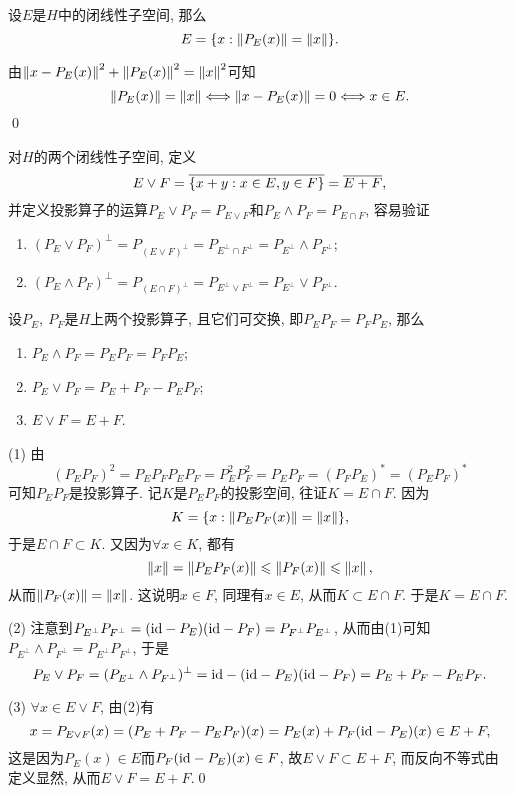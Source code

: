 	\begin{Corollary}
	设$ E $是$ H $中的闭线性子空间, 那么
	\[
	E=\{ x : \norm{P_E(x)}=\norm{x} \}.
	\]
	\end{Corollary}
	\begin{Proof}
	由$ \norm{x-P_E(x)}^2+\norm{P_E(x)}^2=\norm{x}^2 $可知
	\[
	\norm{P_E(x)}=\norm{x}\Longleftrightarrow\norm{x-P_E(x)}=0\Longleftrightarrow x\in E.
	\]
	\qed
	\end{Proof}
	
	对$ H $的两个闭线性子空间, 定义
	\[
	E\lor F=\baro{\{x+y : x\in E, y\in F\}}=\baro{E+F},
	\]
	并定义投影算子的运算$ P_E\lor P_F=P_{E\lor F} $和$ P_E\land P_F=P_{E\cap F} $, 容易验证
	\begin{enumerate}[(1)]
	\item $ (P_E\lor P_F)^\bot=P_{(E\lor F)^\bot}=P_{E^\bot\cap F^\bot}=P_{E^\bot}\land P_{F^\bot} $;
	\item $ (P_E\land P_F)^\bot=P_{(E\cap F)^\bot}=P_{E^\bot\lor F^\bot}=P_{E^\bot}\lor P_{F^\bot} $.
	\end{enumerate}
	
	\begin{Proposition}
	设$ P_E,\ P_F $是$ H $上两个投影算子, 且它们可交换, 即$ P_EP_F=P_FP_E $, 那么
	\begin{enumerate}[(1)]
	\item $ P_E\land P_F=P_EP_F=P_FP_E $;
	\item $ P_E\lor P_F=P_E+P_F-P_EP_F $;
	\item $ E\lor F=E+F $.
	\end{enumerate}
	\end{Proposition}
	\begin{Proof}
	(1) 由
	\[
	(P_EP_F)^2=P_EP_FP_EP_F=P_E^2P_F^2=P_EP_F=(P_FP_E)^*=(P_EP_F)^*
	\]
	可知$ P_EP_F $是投影算子. 记$ K $是$ P_EP_F $的投影空间, 往证$ K=E\cap F $. 因为
	\[
	K=\{ x : \norm{P_EP_F(x)}=\norm{x} \},
	\]
	于是$ E\cap F\subset K $. 又因为$ \forall x\in K $, 都有
	\[
	\norm{x}=\norm{P_EP_F(x)}\leqslant\norm{P_F(x)}\leqslant\norm{x},
	\]
	从而$ \norm{P_F(x)}=\norm{x} $. 这说明$ x\in F $, 同理有$ x\in E $, 从而$ K\subset E\cap F $. 于是$ K=E\cap F $.
	
	(2) 注意到$ P_{E^\bot}P_{F^\bot}=(\id-P_E)(\id-P_F)=P_{F^\bot}P_{E^\bot} $, 从而由(1)可知$ P_{E^\bot}\land P_{F^\bot}=P_{E^\bot}P_{F^\bot} $, 于是
	\[
	P_E\lor P_F=(P_{E^\bot}\land P_{F^\bot})^\bot=\id-(\id-P_E)(\id-P_F)=P_E+P_F-P_EP_F.
	\]
	
	(3) $ \forall x\in E\lor F $, 由(2)有
	\[
	x=P_{E\lor F}(x)=(P_E+P_F-P_EP_F)(x)=P_E(x)+P_F(\id-P_E)(x)\in E+F,
	\]
	这是因为$ P_E(x)\in E $而$ P_F(\id-P_E)(x)\in F $, 故$ E\lor F\subset E+F $, 而反向不等式由定义显然, 从而$ E\lor F=E+F $.\qed
	\end{Proof}
	
